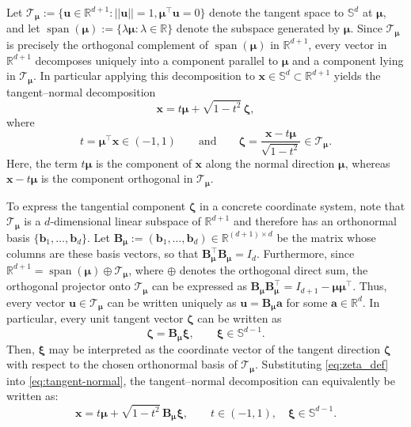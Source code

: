 \documentclass[12pt]{report} %
\newcommand{\bx}{\mathbf{x}}
\newcommand{\bu}{\boldsymbol{u}}
\newcommand{\bzeta}{\boldsymbol{\zeta}}
\newcommand{\bmu}{\boldsymbol{\mu}}
\newcommand{\bxi}{\boldsymbol{\xi}}
\newcommand{\Sd}{\mathbb{S}^{d}}
\newcommand{\Sdm}{\mathbb{S}^{d-1}}
\newcommand{\bB}{\mathbf{B}}
\newcommand{\norm}[1]{\left|\left| #1\right|\right|}
\begin{document}
Let $\mathcal{T}_{\bmu} := \{\mathbf{u} \in \mathbb{R}^{d+1} : \norm{\bu} =1, \bmu^\top \mathbf{u} = 0\}$ denote the tangent space to $\Sd$ at $\bmu$, and let $\operatorname{span}(\bmu) := \{\lambda\bmu : \lambda \in \mathbb{R}\}$ denote the subspace generated by $\bmu$. Since $\mathcal{T}_{\bmu}$ is precisely the orthogonal complement of $\operatorname{span}(\bmu)$ in $\mathbb{R}^{d+1}$, every vector in $\mathbb{R}^{d+1}$ decomposes uniquely into a component parallel to $\bmu$ and a component lying in $\mathcal{T}_{\bmu}$. In particular applying this decomposition to $\bx\in\mathbb{S}^d \subset \mathbb{R}^{d+1}$ yields the tangent--normal decomposition 
\begin{equation}
\label{eq:tangent-normal}
\bx=t\bmu+\sqrt{1-t^2}\,\bzeta,
\end{equation}
where
\begin{equation*}
    t=\bmu^\top\bx\in(-1,1)
    \qquad\text{and}\qquad
    \bzeta=\frac{\bx-t\bmu}{\sqrt{1-t^2}} \in \mathcal{T}_{\bmu}.
\end{equation*}
Here, the term $t\bmu$ is the component of $\bx$ along the normal direction $\bmu$, whereas $\bx-t\bmu$ is the component orthogonal in $\mathcal{T}_{\bmu}$.



To express the tangential component $\bzeta$ in a concrete coordinate system, note that $\mathcal{T}_{\bmu}$ is a $d$-dimensional linear subspace of $\mathbb{R}^{d+1}$ and therefore has an orthonormal basis $\{\mathbf{b}_1,\dots,\mathbf{b}_d\}$. Let $\bB_{\bmu}:=(\mathbf{b}_1, \dots, \mathbf{b}_d) \in\mathbb{R}^{(d+1)\times d}$ be the matrix whose columns are these basis vectors, so that $\bB_{\bmu}^\top\bB_{\bmu}=I_d$. Furthermore, since $\mathbb{R}^{d+1}=\operatorname{span}(\bmu)\oplus\mathcal{T}_{\bmu}$, where $\oplus$ denotes the orthogonal direct sum, the orthogonal projector onto $\mathcal{T}_{\bmu}$ can be expressed as $\bB_{\bmu}\bB_{\bmu}^\top=I_{d+1}-\bmu\bmu^\top$. Thus, every vector $\mathbf u\in\mathcal{T}_{\bmu}$ can be written uniquely as $\mathbf u=\bB_{\bmu}\mathbf a$ for some $\mathbf a\in\mathbb{R}^d$. In particular, every unit tangent vector $\bzeta$ can be written as
\begin{equation}
    \label{eq:zeta_def}
    \bzeta=\bB_{\bmu}\bxi, \qquad \bxi\in\Sdm.
\end{equation}
Then, $\bxi$ may be interpreted as the coordinate vector of the tangent direction $\bzeta$ with respect to the chosen orthonormal basis of $\mathcal{T}_{\bmu}$. Substituting \eqref{eq:zeta_def} into \eqref{eq:tangent-normal}, the tangent--normal decomposition can equivalently be written as: 
\begin{equation}
\label{eq:tangent-normal-basis}
\bx=t\bmu+\sqrt{1-t^2}\,\bB_{\bmu}\bxi,
\qquad t\in(-1,1),\quad \bxi\in\Sdm.
\end{equation}
\end{document}
